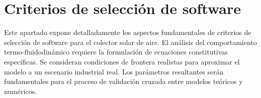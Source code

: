 \section{Criterios de selección de software}
\label{sec:cap08_criterios}

Este apartado expone detalladamente los aspectos fundamentales de criterios de selección de software para el colector solar de aire.
El análisis del comportamiento termo-fluidodinámico requiere la formulación de ecuaciones constitutivas específicas.
Se consideran condiciones de frontera realistas para aproximar el modelo a un escenario industrial real.
Los parámetros resultantes serán fundamentales para el proceso de validación cruzada entre modelos teóricos y numéricos.

